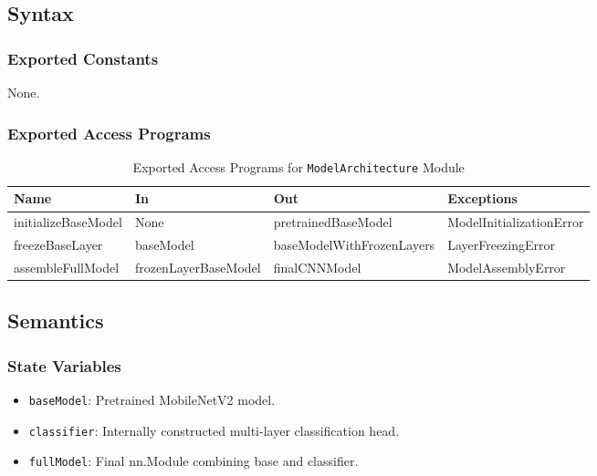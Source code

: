 \documentclass[12pt, titlepage]{article}
\begin{document}
\subsection{Syntax}
\label{sec:ModelArchitectureSyntax}

\subsubsection{Exported Constants}
None.

\subsubsection{Exported Access Programs}
\label{sec:ModelArchitectureExported}

\begin{table}[h!]
\centering
\begin{tabular}{|l|l|l|l|}
\hline
\textbf{Name}         & \textbf{In}           & \textbf{Out}             & \textbf{Exceptions} \\ \hline
initializeBaseModel   & None                  & pretrainedBaseModel     & ModelInitializationError \\ \hline
freezeBaseLayer       & baseModel             & baseModelWithFrozenLayers & LayerFreezingError  \\ \hline
assembleFullModel     & frozenLayerBaseModel  & finalCNNModel           & ModelAssemblyError  \\ \hline
\end{tabular}
\caption{Exported Access Programs for \texttt{ModelArchitecture} Module}
\end{table}

\subsection{Semantics}
\label{sec:ModelArchitectureSemantics}

\subsubsection{State Variables}
\label{sec:ModelArchitectureStateVariables}

\begin{itemize}
    \item \texttt{baseModel}: Pretrained MobileNetV2 model.
    \item \texttt{classifier}: Internally constructed multi-layer classification head.
    \item \texttt{fullModel}: Final nn.Module combining base and classifier.
\end{itemize}
\end{document}
